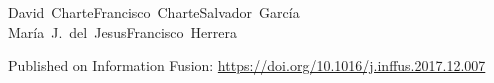 












\newlength{\figwidth}
\setlength{\figwidth}{0.65\textwidth}

\begin{center}
  \mbox{David Charte\quad Francisco Charte\quad Salvador García} \mbox{María J. del Jesus\quad Francisco Herrera}
\end{center}

Published on Information Fusion: \url{https://doi.org/10.1016/j.inffus.2017.12.007}

